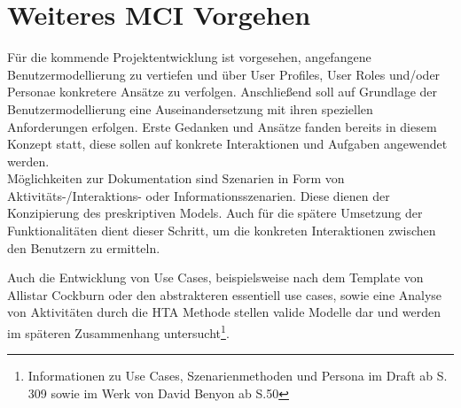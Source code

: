 
\section{Weiteres MCI Vorgehen}
Für die kommende Projektentwicklung ist vorgesehen, angefangene Benutzermodellierung zu vertiefen und über User Profiles, User Roles und/oder Personae konkretere Ansätze zu verfolgen. 
Anschließend soll auf Grundlage der Benutzermodellierung eine Auseinandersetzung mit ihren speziellen Anforderungen erfolgen. Erste Gedanken und Ansätze fanden bereits in diesem Konzept statt, diese sollen  auf konkrete Interaktionen und Aufgaben angewendet werden.\\
Möglichkeiten zur Dokumentation sind Szenarien in Form von Aktivitäts-/Interaktions- oder Informationsszenarien. Diese dienen der Konzipierung des preskriptiven Models. Auch für die spätere Umsetzung der Funktionalitäten dient dieser Schritt, um die konkreten Interaktionen zwischen den Benutzern zu ermitteln.

Auch die Entwicklung von Use Cases, beispielsweise nach dem Template von Allistar Cockburn oder den abstrakteren essentiell use cases, sowie eine Analyse von Aktivitäten durch die HTA Methode stellen valide Modelle dar und werden im späteren Zusammenhang untersucht\footnote{Informationen zu Use Cases, Szenarienmethoden und Persona im Draft ab S. 309 sowie im Werk von David Benyon ab S.50 }.  